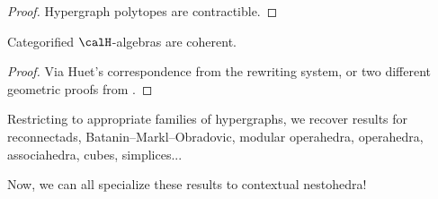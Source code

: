 \begin{proof}
  Hypergraph polytopes are contractible. 
\end{proof}

\begin{thm}
  Categorified $\calH$-algebras are coherent.
\end{thm}

\begin{proof}
  Via Huet's correspondence from the rewriting system, or two different geometric proofs from \cite{CLA1}.
\end{proof}

\begin{example}
  Restricting to appropriate families of hypergraphs, we recover results for reconnectads, Batanin--Markl--Obradovic, modular operahedra, operahedra, associahedra, cubes, simplices... 
\end{example}

Now, we can all specialize these results to contextual nestohedra!

